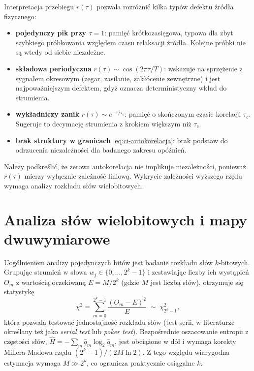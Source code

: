 Interpretacja przebiegu $r(\tau)$ pozwala rozróżnić kilka typów defektu
źródła fizycznego:

\begin{itemize}
  \item \textbf{pojedynczy pik przy $\tau = 1$}: pamięć krótkozasięgowa,
        typowa dla zbyt szybkiego próbkowania względem czasu relaksacji
        źródła. Kolejne próbki nie są wtedy od siebie niezależne.
  \item \textbf{składowa periodyczna} $r(\tau) \sim \cos(2\pi\tau/T)$:
        wskazuje na sprzężenie z sygnałem okresowym (zegar, zasilanie,
        zakłócenie zewnętrzne) i jest najpoważniejszym defektem, gdyż
        oznacza deterministyczny wkład do strumienia.
  \item \textbf{wykładniczy zanik} $r(\tau) \sim e^{-\tau/\tau_c}$:
        pamięć o skończonym czasie korelacji $\tau_c$. Sugeruje to decymację
        strumienia z krokiem większym niż $\tau_c$.
  \item \textbf{brak struktury w granicach} \eqref{eq:ci-autokorelacja}:
        brak podstaw do odrzucenia niezależności dla badanego zakresu
        opóźnień.
\end{itemize}

Należy podkreślić, że zerowa autokorelacja nie implikuje niezależności,
ponieważ $r(\tau)$ mierzy wyłącznie zależność liniową. Wykrycie zależności
wyższego rzędu wymaga analizy rozkładu słów wielobitowych.

\section{Analiza słów wielobitowych i mapy dwuwymiarowe}

Uogólnieniem analizy pojedynczych bitów jest badanie rozkładu słów
$k$-bitowych. Grupując strumień w słowa $w_j \in \{0,\dots,2^k-1\}$ i
zestawiając liczby ich wystąpień $O_m$ z wartością oczekiwaną
$E = M/2^k$ (gdzie $M$ jest liczbą słów), otrzymuje się statystykę
%
\begin{equation}
  \chi^2 = \sum_{m=0}^{2^k-1} \frac{(O_m - E)^2}{E}
  \;\sim\; \chi^2_{2^k-1},
  \label{eq:chi2-slowa}
\end{equation}
%
która pozwala testować jednostajność rozkładu słów (test serii, w literaturze
określany też jako \emph{serial test} lub \emph{poker test}). Bezpośrednie
oszacowanie entropii z częstości słów,
$\hat{H} = -\sum_m \hat{q}_m \log_2 \hat{q}_m$, jest obciążone w dół
i wymaga korekty Millera-Madowa \cite{miller1955} rzędu $(2^k-1)/(2M\ln 2)$.
Z tego względu wiarygodna estymacja wymaga $M \gg 2^k$, co ogranicza
praktycznie osiągalne $k$.

